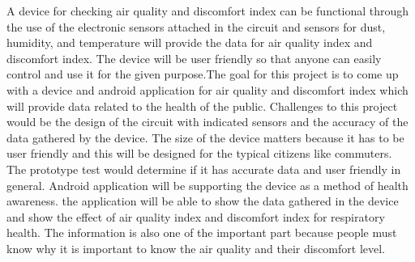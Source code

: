 A device for checking air quality and discomfort index can be functional through the use of the electronic sensors attached in the circuit and sensors for dust, humidity, and temperature will provide the data for air quality index and discomfort index. The device will be user friendly so that anyone can easily control and use it for the given purpose.The goal for this project is to come up with a device and android application for air quality and discomfort index which will provide data related to the health of the public.  Challenges to this project would be the design of the circuit with indicated sensors and the accuracy of the data gathered by the device. The size of the device matters because it has to be user friendly and this will be designed for the typical citizens like commuters. The prototype test  would determine if it has accurate data and user friendly in general. Android application will be supporting the device as a method of health awareness. the application will be able to show the data gathered in the device and show the effect of air quality index and discomfort index for respiratory health. The information is also one of the important part because people must know why it is important to know the air quality and their discomfort level.



